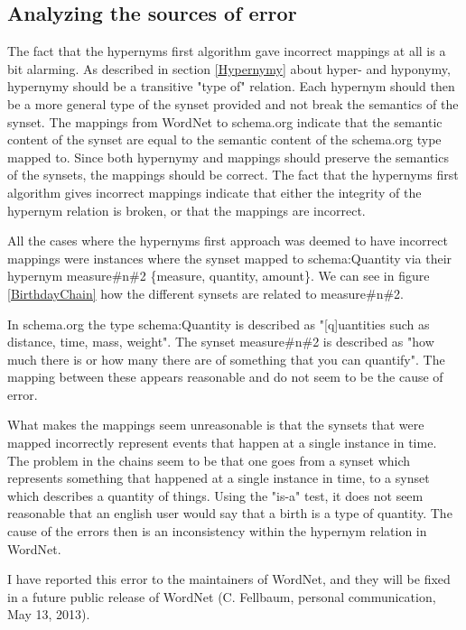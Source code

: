 \subsection{Analyzing the sources of error}
The fact that the hypernyms first algorithm gave incorrect mappings at all is a bit alarming.
As described in section \ref{Hypernymy} about hyper- and hyponymy, hypernymy should be a transitive "type of" relation.
Each hypernym should then be a more general type of the synset provided and not break the semantics of the synset.
The mappings from WordNet to schema.org indicate that the semantic content of the synset are equal to the
semantic content of the schema.org type mapped to.
Since both hypernymy and mappings should preserve the semantics of the synsets, the mappings should be correct.
The fact that the hypernyms first algorithm gives incorrect mappings indicate that either the integrity of the hypernym relation is broken,
or that the mappings are incorrect.

All the cases where the hypernyms first approach was deemed to have incorrect mappings were instances where the synset
mapped to schema:Quantity via their hypernym measure\#n\#2 \{measure, quantity, amount\}.
We can see in figure \ref{BirthdayChain} how the different synsets are related to measure\#n\#2.


In schema.org the type schema:Quantity is described as "[q]uantities such as distance, time, mass, weight".
The synset measure\#n\#2 is described as "how much there is or how many there are of something that you can quantify".
The mapping between these appears reasonable and do not seem to be the cause of error.

What makes the mappings seem unreasonable is that the synsets that were mapped incorrectly represent events that happen at a single instance in time.
The problem in the chains seem to be that one goes from a synset which represents something that happened at a
single instance in time, to a synset which describes a quantity of things.
Using the "is-a" test, it does not seem reasonable that an english user would say that a birth is a type of quantity.
The cause of the errors then is an inconsistency within the hypernym relation in WordNet.

I have reported this error to the maintainers of WordNet, and they will be fixed in a future public release of WordNet
(C. Fellbaum, personal communication, May 13, 2013).

